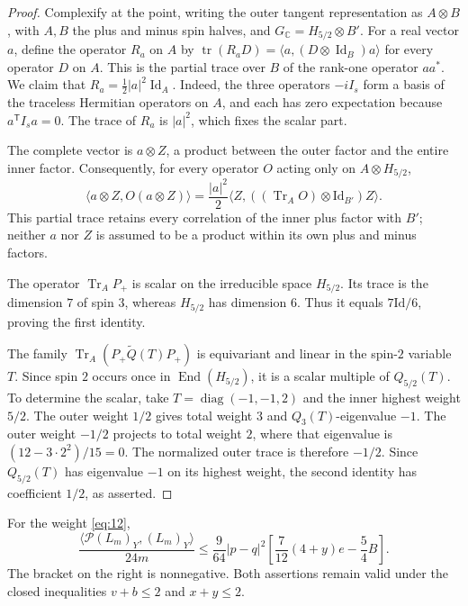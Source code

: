 \begin{proof}
Complexify at the point, writing the outer tangent representation as
\(A\otimes B\), with \(A,B\) the plus and minus spin halves, and
\(G_{\mathbb C}=H_{5/2}\otimes B'\).
For a real vector $a$, define the operator $R_a$ on $A$ by
$\operatorname{tr}(R_aD)=\langle a,(D\otimes\operatorname{Id}_B)a\rangle$
for every operator $D$ on $A$. This is the partial trace over $B$ of the
rank-one operator $a a^*$. We claim that
$R_a=\frac12|a|^2\operatorname{Id}_A$. Indeed, the three operators $-iI_s$ form a basis of the traceless
Hermitian operators on $A$, and each has zero expectation because $a^{\mathsf T}I_sa=0$.
The trace of $R_a$ is $|a|^2$, which fixes the scalar part.

The complete vector is \(a\otimes Z\), a product between the outer
factor and the entire inner factor.  Consequently, for every operator
\(O\) acting only on \(A\otimes H_{5/2}\),
\[
 \langle a\otimes Z,O(a\otimes Z)\rangle
 =\frac{|a|^2}{2}
    \langle Z,((\operatorname{Tr}_A O)\otimes\mathrm{Id}_{B'})Z\rangle.
\]
This partial trace retains every correlation of the inner plus factor
with \(B'\); neither \(a\) nor \(Z\) is assumed to be a product within
its own plus and minus factors.

The operator \(\operatorname{Tr}_A P_+\) is scalar on the irreducible
space \(H_{5/2}\).  Its trace is the dimension \(7\) of spin \(3\),
whereas \(H_{5/2}\) has dimension \(6\).  Thus it equals
\(7\mathrm{Id}/6\), proving the first identity.

The family
\(\operatorname{Tr}_A(P_+\widetilde Q(T)P_+)\) is equivariant and
linear in the spin-\(2\) variable \(T\).  Since spin \(2\) occurs once
in \(\operatorname{End}(H_{5/2})\), it is a scalar multiple of
\(Q_{5/2}(T)\).  To determine the scalar, take
\(T=\operatorname{diag}(-1,-1,2)\) and the inner highest weight
\(5/2\).  The outer weight \(1/2\) gives total weight \(3\) and
\(Q_3(T)\)-eigenvalue \(-1\).  The outer weight \(-1/2\) projects to
total weight \(2\), where that eigenvalue is
\((12-3\cdot2^2)/15=0\).  The normalized outer trace is therefore
\(-1/2\).  Since \(Q_{5/2}(T)\) has eigenvalue \(-1\) on its highest
weight, the second identity has coefficient \(1/2\), as asserted.
\end{proof}

\begin{proposition}
\label{prop:hessian-projection-cost}
For the weight \eqref{eq:12},
\begin{equation}
 \frac{\langle\mathcal P(L_m)_Y,(L_m)_Y\rangle}{24m}
 \le\frac9{64}|p-q|^2
       \left[\frac7{12}(4+y)e-\frac54B\right].
 \tag{14}\label{eq:14}
\end{equation}
The bracket on the right is nonnegative.  Both assertions remain valid
under the closed inequalities \(v+b\le2\) and \(x+y\le2\).
\end{proposition}

